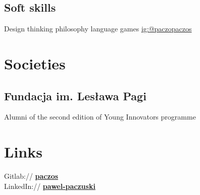 \documentclass[]{deedy-resume-reversed}
\begin{document}
\begin{minipage}[t]{0.33\textwidth}
\subsection{Soft skills}
Design thinking \textbullet{} philosophy \textbullet{} language games \href{https://www.instagram.com/paczopaczos/}{ig:@paczopaczos}




\section{Societies}
\subsection{Fundacja im. Lesława Pagi}
Alumni of the second edition of Young Innovators programme
\sectionsep



\section{Links}
Gitlab:// \href{https://gitlab.com/paczos}{\bf paczos} \\
LinkedIn://  \href{https://www.linkedin.com/in/pawel-paczuski/}{\bf pawel-paczuski} \\
\sectionsep

\end{minipage}
\end{document}

